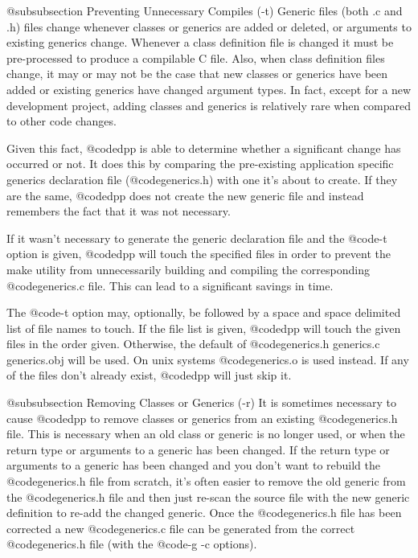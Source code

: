@subsubsection Preventing Unnecessary Compiles (-t)
Generic files (both .c and .h) files change whenever classes or generics
are added or deleted, or arguments to existing generics change.
Whenever a class definition file is changed it must be pre-processed
to produce a compilable C file.  Also, when class definition files
change, it may or may not be the case that new classes or generics
have been added or existing generics have changed argument types.
In fact, except for a new development project, adding classes and
generics is relatively rare when compared to other code changes.

Given this fact, @code{dpp} is able to determine whether a significant
change has occurred or not.  It does this by comparing the pre-existing
application specific generics declaration file (@code{generics.h})
with one it's about to create.  If they are the same, @code{dpp}
does not create the new generic file and instead remembers the fact
that it was not necessary.

If it wasn't necessary to generate the generic declaration file
and the @code{-t} option is given, @code{dpp} will touch the specified
files in order to prevent the make utility from unnecessarily building
and compiling the corresponding @code{generics.c} file.  This
can lead to a significant savings in time.


The @code{-t} option may, optionally, be followed by a space and space
delimited list of file names to touch.  If the file list is given,
@code{dpp} will touch the given files in the order given.  Otherwise, the
default of @code{generics.h generics.c generics.obj} will be used.
On unix systems @code{generics.o} is used instead.  If any of the
files don't already exist, @code{dpp} will just skip it.

@subsubsection Removing Classes or Generics (-r)
It is sometimes necessary to cause @code{dpp} to remove classes or
generics from an existing @code{generics.h} file.  This is necessary
when an old class or generic is no longer used, or when the return type
or arguments to a generic has been changed.  If the return type or
arguments to a generic has been changed and you don't want to rebuild
the @code{generics.h} file from scratch, it's often easier to remove the
old generic from the @code{generics.h} file and then just re-scan the
source file with the new generic definition to re-add the changed
generic.  Once the @code{generics.h} file has been corrected a new
@code{generics.c} file can be generated from the correct
@code{generics.h} file (with the @code{-g -c} options).

